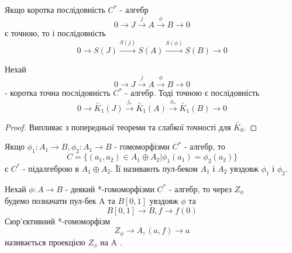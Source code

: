 \begin{theorem}
    Якщо коротка послідовність $C^*$ - алгебр
    \begin{equation*}
        0 \to J \xrightarrow{j} A \xrightarrow{\phi} B \to 0
    \end{equation*}
    є точною, то і послідовність
    \begin{equation*}
        0 \to S(J) \xrightarrow{S(j)} S(A) \xrightarrow{S(\phi)} S(B) \to 0
    \end{equation*}

\end{theorem}

\begin{theorem}
    Нехай
    \begin{equation*}
        0 \to J \xrightarrow{j} A \xrightarrow{\phi} B \to 0
    \end{equation*}
    - коротка точна послідовність $C^*$ - алгебр.
    Тоді точною є послідовність
    \begin{equation*}
        0 \to \widetilde{K_1}(J) \xrightarrow{j_*} \widetilde{K_1}(A) \xrightarrow{\phi_*} \widetilde{K_1}(B) \to 0
    \end{equation*}

    \begin{proof}
        Випливає з попередньої теореми та слабкої точності для $\widetilde{K_0}$.
    \end{proof}
\end{theorem}

Якщо $\phi_1: A_1 \to B, \phi_2: A_1 \to B$ - гомоморфізми $C^*$ - алгебр, то
\begin{equation*}
    C = \{(a_1, a_2) \in A_1 \oplus A_2 | \phi_1(a_1) = \phi_2(a_2)\}
\end{equation*}
є $C^*$ - підалгеброю в $A_1 \oplus A_2$.
Її називають пул-беком $A_1$ і $A_2$ увздовж $\phi_1$ і $\phi_2$.

Нехай $\phi: A \to B$ - деякий *-гомоморфізми $C^*$ - алгебр, то через $Z_\phi$ \\ будемо позначати пул-бек
A та $B[0,1]$ увздовж $\phi$ та
\begin{equation*}
    B[0,1] \to B, f \to f(0)
\end{equation*}
Сюр'єктивний *-гомоморфізм
\begin{equation*}
    Z_\phi \to A, (a, f) \to a
\end{equation*}
називається проекцією $Z_\phi$ на A .


